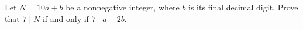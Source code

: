 Let $N=10a+b$ be a nonnegative integer, where $b$ is its final decimal digit. Prove that $7\mid N$ if and only if $7\mid a-2b$.
